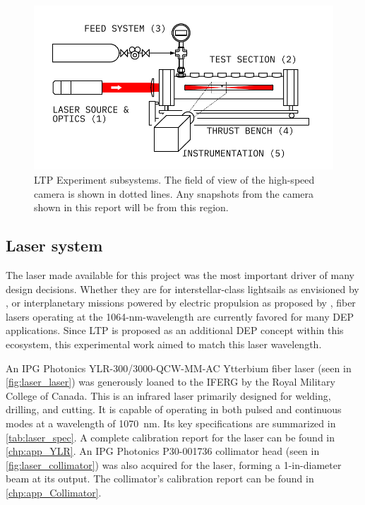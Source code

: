         \begin{figure}[h]
            \centering
            \includegraphics[]{assets/3 design/experiment_diagram}
            \caption[LTP Experiment subsystems]{LTP Experiment subsystems. The field of view of the high-speed camera is shown in dotted lines. Any snapshots from the camera shown in this report will be from this region.}
            \label{fig:exp_subsys}
        \end{figure}

        \subsection{Laser system}
            The laser made available for this project was the most important driver of many design decisions. Whether they are for interstellar-class lightsails as envisioned by \textcite{lubinRoadmapInterstellarFlight2016a}, or interplanetary missions powered by electric propulsion as proposed by \textcite{sheerinFastSolarSystem2021}, fiber lasers operating at the 1064-nm-wavelength are currently favored for many DEP applications. Since LTP is proposed as an additional DEP concept within this ecosystem, this experimental work aimed to match this laser wavelength.

            An IPG Photonics YLR-300/3000-QCW-MM-AC Ytterbium fiber laser (seen in \autoref{fig:laser_laser}) was generously loaned to the IFERG by the Royal Military College of Canada. This is an infrared laser primarily designed for welding, drilling, and cutting. It is capable of operating in both pulsed and continuous modes at a wavelength of \qty{1070}{nm}. Its key specifications are summarized in \autoref{tab:laser_spec}. A complete calibration report for the laser can be found in \autoref{chp:app_YLR}. An IPG Photonics P30-001736 collimator head (seen in \autoref{fig:laser_collimator}) was also acquired for the laser, forming a 1-in-diameter beam at its output. The collimator's calibration report can be found in \autoref{chp:app_Collimator}.

